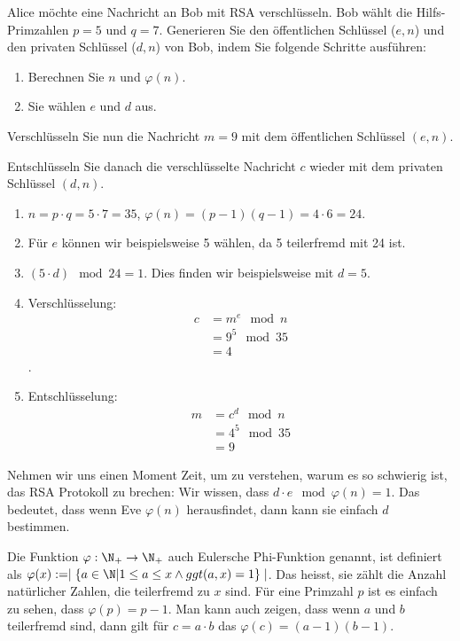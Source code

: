 	\begin{myexercise}
	Alice möchte eine Nachricht an Bob mit RSA verschlüsseln. Bob wählt die Hilfs-Primzahlen \( p = 5 \) und \( q = 7 \). Generieren Sie den öffentlichen Schlüssel ($e, n$) und den privaten Schlüssel ($d, n$) von Bob, indem Sie folgende Schritte ausführen:
	\begin{enumerate}
		\item Berechnen Sie \( n \) und \( \varphi(n) \).
		\item Sie wählen $e$ und $d$ aus.
	\end{enumerate}

	Verschlüsseln Sie nun die Nachricht \( m = 9 \) mit dem öffentlichen Schlüssel \( (e, n) \).

	Entschlüsseln Sie danach die verschlüsselte Nachricht \( c \) wieder mit dem privaten Schlüssel \( (d, n) \).
	\begin{myanswer}
		\begin{enumerate}
			\item \( n = p \cdot q = 5 \cdot 7 = 35 \), \( \varphi(n) = (p-1)(q-1) = 4 \cdot 6 = 24 \).
			\item Für $e$ können wir beispielsweise 5 wählen, da 5 teilerfremd mit 24 ist.
			\item \( (5 \cdot d) \mod 24 = 1\). Dies finden wir beispielsweise mit \( d = 5 \).
			\item Verschlüsselung:
			      \begin{align*}
				      c & = m^e\mod n\\
				        & = 9^5 \mod 35 \\
				        & = 4
			      \end{align*}.
			\item Entschlüsselung:
			      \begin{align*}
				      m & = c^d\mod n    \\
				        & =4^{5} \mod 35 \\
				        & = 9
			      \end{align*}
		\end{enumerate}
	\end{myanswer}
\end{myexercise}

Nehmen wir uns einen Moment Zeit, um zu verstehen, warum es so schwierig ist, das RSA Protokoll zu brechen: Wir wissen, dass $d\cdot e  \mod \varphi(n) = 1$. Das bedeutet, dass wenn Eve $\varphi(n)$ herausfindet, dann kann sie einfach $d$ bestimmen. 

Die Funktion $\varphi: \N_+\rightarrow \N_+$ auch Eulersche Phi-Funktion genannt, ist definiert als $\varphi(x) := \mid \{a\in\N | 1\leq a\leq x \wedge ggt(a,x) = 1\}\mid$. Das heisst, sie zählt die Anzahl natürlicher Zahlen, die teilerfremd zu $x$ sind. Für eine Primzahl $p$ ist es einfach zu sehen, dass $\varphi(p) = p-1$. Man kann auch zeigen, dass wenn $a$ und $b$ teilerfremd sind, dann gilt für $c=a\cdot b$ das $\varphi(c) = (a-1)(b-1)$. 

